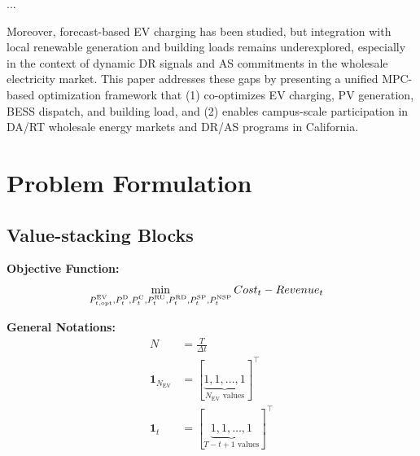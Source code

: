 \documentclass[conference]{IEEEtran}
\begin{document}
...



Moreover, forecast-based EV charging has been studied, but integration with local renewable generation and building loads remains underexplored, especially in the context of dynamic DR signals and AS commitments in the wholesale electricity market. This paper addresses these gaps by presenting a unified MPC-based optimization framework that (1) co-optimizes EV charging, PV generation, BESS dispatch, and building load, and (2) enables campus-scale participation in DA/RT wholesale energy markets and DR/AS programs in California.

\section{Problem Formulation}

\subsection{Value-stacking Blocks}

\textbf{Objective Function:}
\begin{align}
    &\min_{\substack{P^{\rm EV}_{t,\text{opt}}, P^{\text{D}}_{t}, P^{\text{C}}_{t}, P^{\text{RU}}_t, P^{\text{RD}}_t, P^{\text{SP}}_t, P^{{\text{NSP}}}_t}} Cost_t - Revenue_t \label{eq:obj}
\end{align}


\textbf{General Notations:}
\begin{align}
    N &= \frac{T}{\Delta{t}} \label{eq:N} \\
%    
    \mathbf{1}_{N_{\text{EV}}} &= \left[ \underbrace{1, 1, \dots, 1}_{N_{\text{EV}} \text{ values}} \right]^\top \label{eq:1nev}\\
%    
    \mathbf{1}_t &= \left[ \underbrace{1, 1, \dots, 1}_{T-t+1 \text{ values}} \right]^\top \label{eq:1t}
\end{align}
\end{document}
